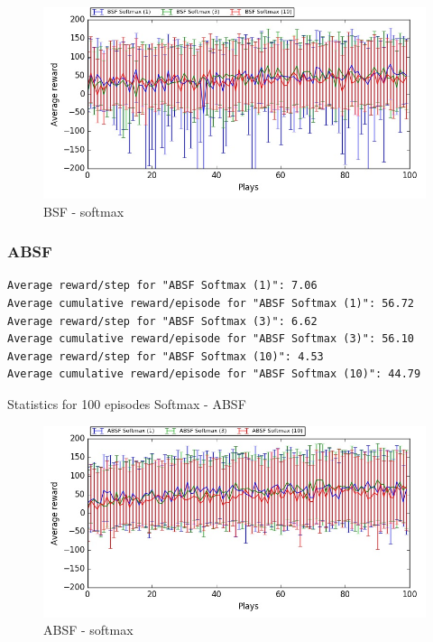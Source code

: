 \documentclass[11pt, a4paper]{article}
\begin{document}
\begin{figure}[H]
\centering
\includegraphics[width=14cm]{BSF_sfmax_Learning}
\caption{BSF - softmax}
\end{figure}


\subsubsection*{ABSF}
\begin{listing}
\begin{verbatim}
Average reward/step for "ABSF Softmax (1)": 7.06
Average cumulative reward/episode for "ABSF Softmax (1)": 56.72
Average reward/step for "ABSF Softmax (3)": 6.62
Average cumulative reward/episode for "ABSF Softmax (3)": 56.10
Average reward/step for "ABSF Softmax (10)": 4.53
Average cumulative reward/episode for "ABSF Softmax (10)": 44.79
\end{verbatim}
\caption{Statistics for 100 episodes Softmax - ABSF}
\end{listing}

\begin{figure}[H]
\centering
\includegraphics[width=14cm]{ABSF_sfmax_Learning}
\caption{ABSF - softmax}
\end{figure}
\end{document}
